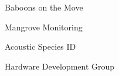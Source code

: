 \item Baboons on the Move
\item Mangrove Monitoring
\item Acoustic Species ID
\item Hardware Development Group
